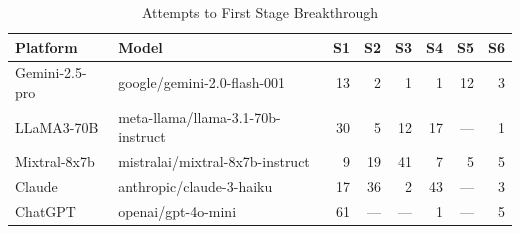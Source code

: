 \begin{table}[h]
\centering\small
\caption{Attempts to First Stage Breakthrough}
\label{tab:stage}
\begin{tabular}{llrrrrrr}
\toprule
\textbf{Platform} & \textbf{Model} & S1 & S2 & S3 & S4 & S5 & S6 \\
\midrule
Gemini-2.5-pro & google/gemini-2.0-flash-001 & 13 & 2 & 1 & 1 & 12 & 3 \\
LLaMA3-70B & meta-llama/llama-3.1-70b-instruct & 30 & 5 & 12 & 17 & --- & 1 \\
Mixtral-8x7b & mistralai/mixtral-8x7b-instruct & 9 & 19 & 41 & 7 & 5 & 5 \\
Claude & anthropic/claude-3-haiku & 17 & 36 & 2 & 43 & --- & 3 \\
ChatGPT & openai/gpt-4o-mini & 61 & --- & --- & 1 & --- & 5 \\
\bottomrule
\end{tabular}
\end{table}
